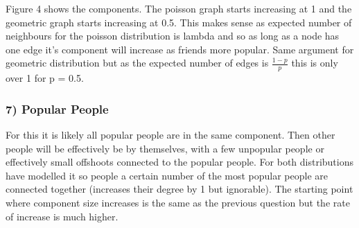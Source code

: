 \documentclass[a4paper, 11pt, oneside]{report}
\begin{document}
Figure 4 shows the components. The poisson graph starts increasing at 1 and the geometric graph starts increasing at 0.5.
This makes sense as expected number of neighbours for the poisson distribution is lambda and so as long as a node has one edge it's component will increase as friends more popular.
Same argument for geometric distribution but as the expected number of edges is $\frac{1-p}{p}$ this is only over 1 for p = 0.5.

\subsubsection*{7) Popular People}
For this it is likely all popular people are in the same component. Then other people will be effectively be by themselves, with a few unpopular people or effectively small
offshoots connected to the popular people. For both distributions have modelled it so people a certain number of the most popular people are connected together (increases their degree by 1 but ignorable).
The starting point where component size increases is the same as the previous question but the rate of increase is much higher.
\end{document}
